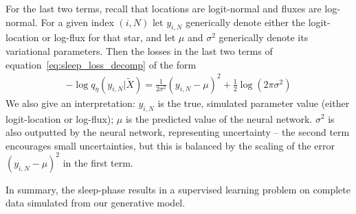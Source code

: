 For the last two terms, recall that locations are logit-normal and fluxes are log-normal. 
For a given index $(i, N)$ let $y_{i,N}$ generically denote either the 
logit-location or log-flux for that star, 
and let $\mu$ and $\sigma^2$ generically denote its variational parameters. 
Then the losses in the last two terms of equation~\ref{eq:sleep_loss_decomp}
of the form 
\begin{align}
    -\log q_\eta(y_{i,N} | \tilde X) = 
        \frac{1}{2\sigma^2}(y_{i,N} - \mu)^2 + \frac{1}{2}\log(2\pi\sigma^2)
\end{align}
We also give an interpretation: $y_{i,N}$ is the true, simulated parameter value (either logit-location or log-flux); $\mu$ is the predicted value of the neural network. $\sigma^2$ is also outputted by the neural network, representing uncertainty -- the second term encourages small uncertainties, but this is 
balanced by the scaling of the error $(y_{i,N} - \mu)^2$ in the first term. 

In summary, the sleep-phase results in a supervised learning problem on complete data simulated from our generative model. 

